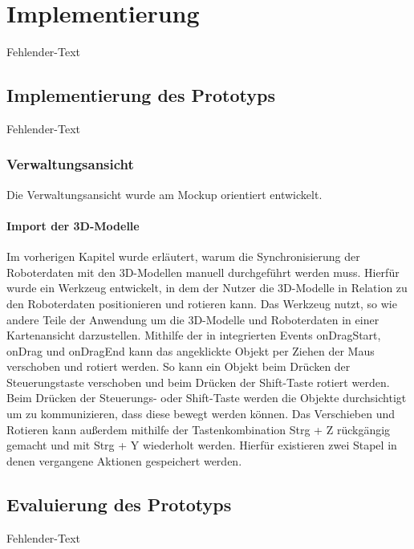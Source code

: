 \newpage
\section{Implementierung}
Fehlender-Text

\subsection{Implementierung des Prototyps}
Fehlender-Text

\subsubsection{Verwaltungsansicht}
Die Verwaltungsansicht wurde am Mockup orientiert entwickelt. 

\paragraph{Import der 3D-Modelle}


Im vorherigen Kapitel wurde erläutert, warum die Synchronisierung der Roboterdaten mit den 3D-Modellen manuell durchgeführt werden muss. Hierfür wurde ein Werkzeug entwickelt, in dem der Nutzer die 3D-Modelle in Relation zu den Roboterdaten positionieren und rotieren kann.
Das Werkzeug nutzt, so wie andere Teile der Anwendung \deckgl um die 3D-Modelle und Roboterdaten in einer Kartenansicht darzustellen. Mithilfe der in \deckgl integrierten Events onDragStart, onDrag und onDragEnd kann das angeklickte Objekt per Ziehen der Maus verschoben und rotiert werden. So kann ein Objekt beim Drücken der Steuerungstaste verschoben und beim Drücken der Shift-Taste rotiert werden. Beim Drücken der Steuerungs- oder Shift-Taste werden die Objekte durchsichtigt um zu kommunizieren, dass diese bewegt werden können. Das Verschieben und Rotieren kann außerdem mithilfe der Tastenkombination Strg + Z rückgängig gemacht und mit Strg + Y wiederholt werden. Hierfür existieren zwei Stapel in denen vergangene Aktionen gespeichert werden.

\newpage
\subsection{Evaluierung des Prototyps}
Fehlender-Text